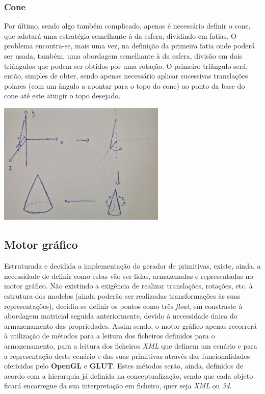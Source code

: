 \subsubsection{Cone}

Por último, sendo algo também complicado, apenas é necessário definir o
cone, que adotará uma estratégia semelhante à da esfera, dividindo em
fatias.\newline
\break
\noindent
O problema encontra-se, mais uma vez, na definição da primeira fatia
onde poderá ser usada, também, uma abordagem semelhante à da esfera,
divisão em dois triângulos que podem ser obtidos por uma rotação.\newline
\break
\noindent
O primeiro triângulo será, então, simples de obter, sendo apenas
necessário aplicar sucessivas translações polares (com um ângulo a 
apontar para o topo do cone) ao ponto da base do cone até este atingir
o topo desejado.\newline
\break

\begin{center}
    \includegraphics[width=0.6\textwidth]{imgs/cone.png}
    \label{fig:cone}
\end{center}

\subsection{Motor gráfico}

Estruturada e decidida a implementação do gerador de primitivas, existe,
ainda, a necessidade de definir como estas vão ser lidas, armazenadas e
representadas no motor gráfico.\newline
\break
\noindent
Não existindo a exigência de realizar translações, rotações, etc. à
estrutura dos modelos (ainda poderão ser realizadas transformações às suas
representações), decidiu-se definir os pontos como três \textit{float},
em constraste à abordagem matricial seguida anteriormente, devido à
necessidade única do armazenamento das propriedades.\newline
\break
\noindent
Assim sendo, o motor gráfico apenas recorrerá à utilização de métodos para
a leitura dos ficheiros definidos para o armazenamento, para a leitura dos
ficheiros \textit{XML} que definem um cenário e para a representação deste
cenário e das suas primitivas através das funcionalidades ofericidas pelo
\textbf{OpenGL} e \textbf{GLUT}.\newline
\break
\noindent
Estes métodos serão, ainda, definidos de acordo com a hierarquia
já definida na conceptualização, sendo que cada objeto ficará
encarregue da sua interpretação em ficheiro, quer seja \textit{XML}
ou \textit{3d}.